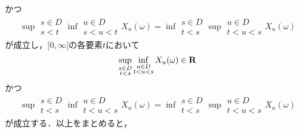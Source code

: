 	かつ
	\begin{align}
		\sup{\substack{s \in D \\ s < t}}{\inf{\substack{u \in D \\ s < u < t}}{X_u(\omega)}} 
		= \inf{\substack{s \in D \\ t < s}}{\sup{\substack{u \in D \\ t < u < s}}{X_u(\omega)}}
	\end{align}
	が成立し，$[0,\infty[$の各要素$t$において
	\begin{align}
		\operatorname*{sup}_{\substack{s \in D \\ t < s}} \operatorname*{inf}_{\substack{u \in D \\ t < u < s}} X_u(\omega) \in \mathbf{R}
	\end{align}
	かつ
	\begin{align}
		\sup{\substack{s \in D \\ t < s}}{\inf{\substack{u \in D \\ t < u < s}}{X_u(\omega)}} 
		= \inf{\substack{s \in D \\ t < s}}{\sup{\substack{u \in D \\ t < u < s}}{X_u(\omega)}}
	\end{align}
	が成立する．以上をまとめると，
	
